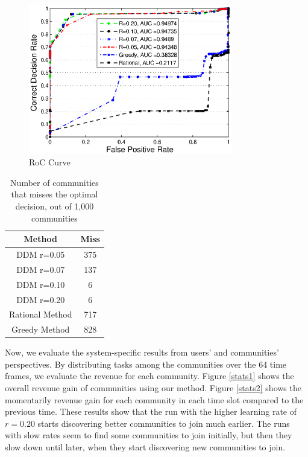 \documentclass[11pt,onecolumn]{IEEEtran}
\begin{document}
{\begin{figure}%
\centering
\includegraphics[width=3.5in]{figures/roc.eps}
\caption{RoC Curve}
\label{roc5}
\end{figure}

\begin{table}[ht]
\caption{Number of communities that misses the optimal decision, out of 1,000 communities} %
\centering %
\begin{tabular}{|c|c|} %
\hline %
 Method&Miss \\ [0.5ex] %
\hline %
 DDM r=0.05& 375 \\ %
 DDM r=0.07& 137 \\
 DDM r=0.10& 6 \\
 DDM r=0.20& 6 \\
Rational Method& 717 \\
Greedy Method& 828 \\ [1ex] %
\hline %
\end{tabular}
\label{fail_rate} %
\end{table}


Now, we evaluate the system-specific results from users' and communities' perspectives. By distributing tasks among the communities over the 64 time frames, we evaluate the revenue for each community. Figure \ref{stats1} shows the overall revenue gain of communities using our method. Figure \ref{stats2} shows the momentarily revenue gain for each community in each time slot compared to the previous time. These results show that the run with the higher learning rate of $r=0.20$ starts discovering better communities to join much earlier. The runs with slow rates seem to find some communities to join initially, but then they slow down until later, when they start discovering new communities to join.


}
\end{document}
